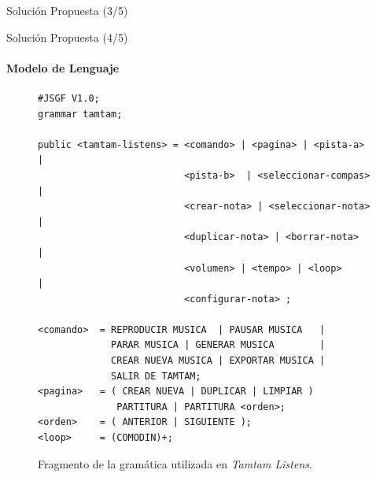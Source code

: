 \begin{frame}{Soluci\'on Propuesta (3/5)}

\end{frame}


\begin{frame}[fragile]{Soluci\'on Propuesta (4/5)}
\framesubtitle{Modelo de Lenguaje}
\begin{figure}[H]
\lstset{basicstyle=\ttfamily\scriptsize}
\begin{lstlisting}
#JSGF V1.0;
grammar tamtam;

public <tamtam-listens> = <comando> | <pagina> | <pista-a>  |
                          <pista-b>  | <seleccionar-compas> | 
                          <crear-nota> | <seleccionar-nota> | 
                          <duplicar-nota> | <borrar-nota>   | 
                          <volumen> | <tempo> | <loop>      |
                          <configurar-nota> ;

<comando>  = REPRODUCIR MUSICA  | PAUSAR MUSICA   |
             PARAR MUSICA | GENERAR MUSICA        | 
             CREAR NUEVA MUSICA | EXPORTAR MUSICA | 
             SALIR DE TAMTAM;
<pagina>   = ( CREAR NUEVA | DUPLICAR | LIMPIAR ) 
              PARTITURA | PARTITURA <orden>;
<orden>    = ( ANTERIOR | SIGUIENTE );
<loop>     = (COMODIN)+;
\end{lstlisting}
\caption{Fragmento de la gram\'atica utilizada en \emph{Tamtam Listens}.}
\label{figure:fragmento-gram}
\end{figure} 
\end{frame}

